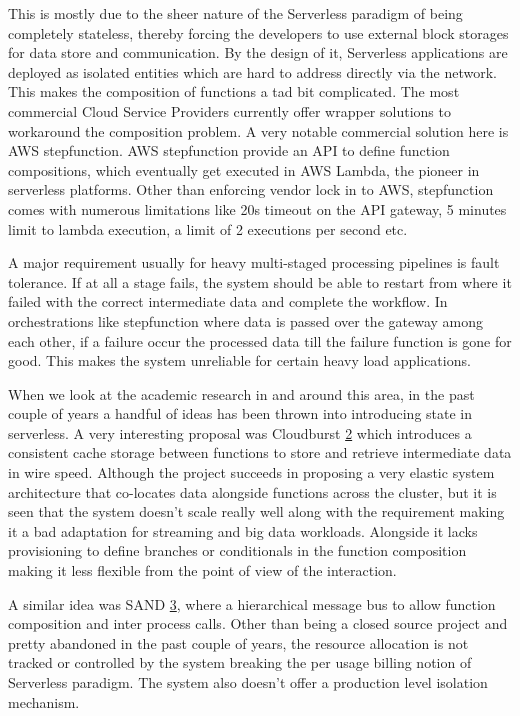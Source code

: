 \documentclass[12pt,titlepage]{article}
\begin{document}
This is mostly due to the sheer
nature of the Serverless paradigm of being completely stateless, thereby forcing
the developers to use external block storages for data store and communication.
By the design of it, Serverless applications are deployed as isolated entities
which are hard to address directly via the network. This makes the composition
of functions a tad bit complicated. The most commercial Cloud Service Providers
currently offer wrapper solutions to workaround the composition problem. A very
notable commercial solution here is AWS stepfunction. AWS stepfunction provide
an API to define function compositions, which eventually get executed in AWS
Lambda, the pioneer in serverless platforms. Other than enforcing vendor lock in
to AWS, stepfunction comes with numerous limitations like 20s timeout on the API
gateway, 5 minutes limit to lambda execution, a limit of 2 executions per second
etc.

A major requirement usually for heavy multi-staged processing pipelines is fault
tolerance. If at all a stage fails, the system should be able to restart from
where it failed with the correct intermediate data and complete the workflow. In
orchestrations like stepfunction where data is passed over the gateway among
each other, if a failure occur the processed data till the failure function is
gone for good. This makes the system unreliable for certain heavy load applications.

When we look at the academic research in and around this area, in the past
couple of years a handful of ideas has been thrown into introducing state in
serverless. A very interesting proposal was Cloudburst \hyperref[ref:2]{2} which
introduces a consistent cache storage between functions to store and retrieve
intermediate data in wire speed. Although the project succeeds in proposing a
very elastic system architecture that co-locates data alongside functions across
the cluster, but it is seen that the system doesn't scale really well along with
the requirement making it a bad adaptation for streaming and big data workloads.
Alongside it lacks provisioning to define branches or conditionals in the function
composition making it less flexible from the point of view of the interaction.

A similar idea was SAND \hyperref[ref:3]{3}, where a hierarchical message bus to allow
function composition and inter process calls. Other than being a closed source
project and pretty abandoned in the past couple of years, the resource
allocation is not tracked or controlled by the system breaking the per usage
billing notion of Serverless paradigm. The system also doesn't offer a
production level isolation mechanism.
\end{document}
